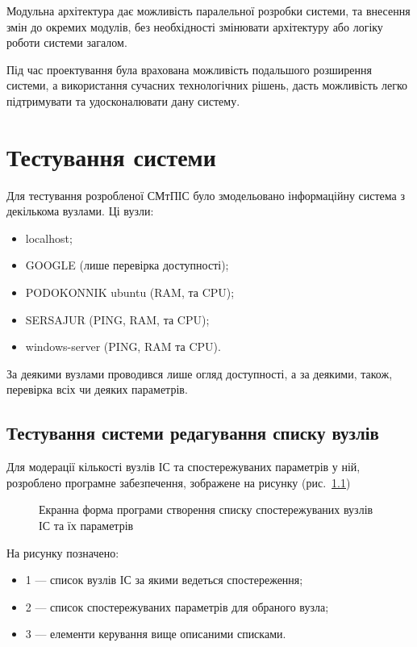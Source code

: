 \documentclass{thesis_utf8}
\begin{document}
Модульна архітектура дає можливість паралельної розробки системи, та внесення змін до окремих модулів, без необхідності змінювати архітектуру або логіку роботи системи загалом.

Під час проектування була врахована можливість подальшого розширення системи, а використання сучасних технологічних рішень, дасть можливість легко підтримувати та удосконалювати дану систему.

\chapter{Тестування системи}

Для тестування розробленої СМтПІС було змодельовано інформаційну система з декількома вузлами. Ці вузли:
\begin{itemize}
    \item localhost;
    \item GOOGLE (лише перевірка доступності);
    \item PODOKONNIK ubuntu (RAM, та CPU);
    \item SERSAJUR (PING, RAM, та CPU);
    \item windows-server (PING, RAM та CPU).
\end{itemize}

За деякими вузлами проводився лише огляд доступності, а за деякими, також, перевірка всіх чи деяких параметрів.

\section{Тестування системи редагування списку вузлів}
\label{section:editor}

Для модерації кількості вузлів ІС та спостережуваних параметрів у ній, розроблено програмне забезпечення, зображене на рисунку (рис.~\ref{fig:editor})

\begin{figure}[!h]
    \centering
    \caption{Екранна форма програми створення списку спостережуваних вузлів ІС та їх параметрів}
    \label{fig:editor}
\end{figure}

На рисунку позначено:
\begin{itemize}
    \item 1 --- список вузлів ІС за якими ведеться спостереження;
    \item 2 --- список спостережуваних параметрів для обраного вузла;
    \item 3 --- елементи керування вище описаними списками.
\end{itemize}
\end{document}
